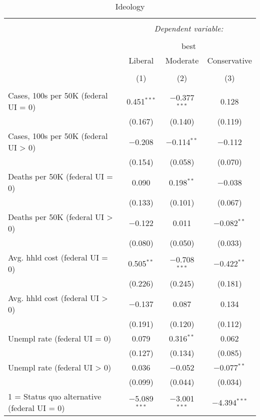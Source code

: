 
\begin{table}[!htbp] \centering 
  \caption{Ideology} 
  \label{} 
\begin{tabular}{@{\extracolsep{5pt}}lccc} 
\\[-1.8ex]\hline 
\hline \\[-1.8ex] 
 & \multicolumn{3}{c}{\textit{Dependent variable:}} \\ 
\cline{2-4} 
\\[-1.8ex] & \multicolumn{3}{c}{best} \\ 
 & Liberal & Moderate & Conservative \\ 
\\[-1.8ex] & (1) & (2) & (3)\\ 
\hline \\[-1.8ex] 
 Cases, 100s per 50K (federal UI = 0) & 0.451$^{***}$ & $-$0.377$^{***}$ & 0.128 \\ 
  & (0.167) & (0.140) & (0.119) \\ 
  Cases, 100s per 50K (federal UI > 0) & $-$0.208 & $-$0.114$^{**}$ & $-$0.112 \\ 
  & (0.154) & (0.058) & (0.070) \\ 
  Deaths per 50K (federal UI = 0) & 0.090 & 0.198$^{**}$ & $-$0.038 \\ 
  & (0.133) & (0.101) & (0.067) \\ 
  Deaths per 50K (federal UI > 0) & $-$0.122 & 0.011 & $-$0.082$^{**}$ \\ 
  & (0.080) & (0.050) & (0.033) \\ 
  Avg. hhld cost (federal UI = 0) & 0.505$^{**}$ & $-$0.708$^{***}$ & $-$0.422$^{**}$ \\ 
  & (0.226) & (0.245) & (0.181) \\ 
  Avg. hhld cost (federal UI > 0) & $-$0.137 & 0.087 & 0.134 \\ 
  & (0.191) & (0.120) & (0.112) \\ 
  Unempl rate (federal UI = 0) & 0.079 & 0.316$^{**}$ & 0.062 \\ 
  & (0.127) & (0.134) & (0.085) \\ 
  Unempl rate (federal UI > 0) & 0.036 & $-$0.052 & $-$0.077$^{**}$ \\ 
  & (0.099) & (0.044) & (0.034) \\ 
  1 = Status quo alternative (federal UI = 0) & $-$5.089$^{***}$ & $-$3.001$^{***}$ & $-$4.394$^{***}$ \\ 

\end{tabular}
\end{table}
